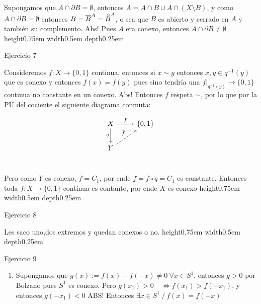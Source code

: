 \documentclass[11pt]{article}
\newcommand{\sett}[1]{\{#1\}}
\newcommand{\interior}[1]{\accentset{\smash{\raisebox{-0.12ex}{$\scriptstyle\circ$}}}{#1}\rule{0pt}{2.3ex}}
\newenvironment{proof}[1][Demostraci\'on]{\begin{trivlist}
\item[\hskip \labelsep {\bfseries #1}]}{\end{trivlist}}
\newcommand{\qed}{\nobreak \ifvmode \relax \else
      \ifdim\lastskip<1.5em \hskip-\lastskip
      \hskip1.5em plus0em minus0.5em \fi \nobreak
      \vrule height0.75em width0.5em depth0.25em\fi}
\begin{document}
\begin{enumerate}
\begin{proof}
Supongamos que $A \cap \partial B = \emptyset$, entonces $A = A \cap B \cup A \cap (X \setminus B)$, y como $A \cap \partial B = \emptyset$ entonces $B = \overline{B}^{A} = \interior{B}^{A}$, o sea que $B$ es abierto y cerrado en $A$ y tambi\'en su complemento. Abs! Pues $A$ era conexo, entonces $A \cap \partial B \neq \emptyset$ \qed

\end{proof}

\item {Ejercicio 7}

\begin{proof}

Consideremos $f : X \rightarrow \sett{0,1}$ continua, entonces si $x \sim y$ entonces $x,y \in q^{-1}(y)$ que es conexo y entonces $f(x)=f(y)$ pues sino tendr\'ia una $f|_{q^{-1}(y)} \rightarrow \sett{0,1}$ continua no constante en un conexo. Abs! Entonces $f$ respeta $\sim$, por lo que por la PU del cociente el siguiente diagrama conmuta:

\[
\begin{tikzcd}
X \arrow{r}{f} \arrow[swap]{d}{q} & \sett{0,1} \\
Y \arrow[dashed]{ur}{\overline{f}} \\
\end{tikzcd}
\]

Pero como $Y$ es conexo, $\overline{f} = C_{1}$, por ende $f = \overline{f} \circ q = C_{1}$ es constante. Entonces toda $f:X \rightarrow \sett{0,1}$ continua es contante, por ende $X$ es conexo \qed 

\end{proof}

\item {Ejercicio 8}

\begin{proof}

Les saco uno,dos extremos y quedan conexos o no.\qed 

\end{proof}

\item {Ejercicio 9}

\begin{proof}

\begin{enumerate}

\item Supongamos que $g(x):=f(x)-f(-x) \neq 0 \ \forall x \in S^1$, entonces $g > 0$ por Bolzano pues $S^1$ es conexo. Pero $g(x_1) > 0 \quad \Longleftrightarrow f(x_1) > f(-x_1)$, y entonces $g(-x_1) < 0$ ABS! Entonces $\exists x \in S^1 \ / \ f(x)=f(-x)$


\end{enumerate}
\end{proof}
\end{enumerate}
\end{document}
